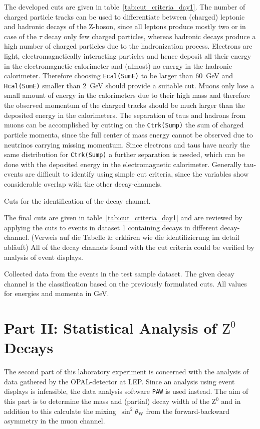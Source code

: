\documentclass[11pt, a4paper]{article}
\numberwithin{equation}{section}
\newcommand{\korr}[1]{{\color{red}(#1)}}
\begin{document}
The developed cuts are given in table~\ref{tab:cut_criteria_day1}.
The number of charged particle tracks can be used to differentiate between (charged) leptonic and hadronic decays of the Z-boson, since all leptons produce mostly two or in case of the $\tau$ decay only few charged particles, whereas hadronic decays produce a high number of charged particles due to the hadronization process.
Electrons are light, electromagnetically interacting particles and hence deposit all their energy in the electromagnetic calorimeter and (almost) no energy in the hadronic calorimeter.
Therefore choosing \texttt{Ecal(SumE)} to be larger than \SI{60}{GeV} and \texttt{Hcal(SumE)} smaller than \SI{2}{GeV} should provide a suitable cut.
Muons only lose a small amount of energy in the calorimeters due to their high mass and therefore the observed momentum of the charged tracks should be much larger than the deposited energy in the calorimeters.
The separation of taus and hadrons from muons can be accomplished by cutting on the \texttt{Ctrk(Sump)} the sum of charged particle momenta, since the full center of mass energy cannot be observed due to neutrinos carrying missing momentum.
Since electrons and taus have nearly the same distribution for \texttt{Ctrk(Sump)} a further separation is needed, which can be done with the deposited energy in the electromagnetic calorimeter.
Generally tau-events are difficult to identify using simple cut criteria, since the variables show considerable overlap with the other decay-channels.
\begin{table}[htb]
	\centering
	
	\caption{Cuts for the identification of the decay channel.}
	\label{tab:cut_criteria_day1}
\end{table}

The final cuts are given in table~\ref{tab:cut_criteria_day1} and are reviewed by applying the cuts to events in dataset 1 containing decays in different decay-channel.
\korr{Verweis auf die Tabelle \& erklären wie die identifizierung im detail abläuft}
All of the decay channels found with the cut criteria could be verified by analysis of event displays.
\begin{table}
	\centering
		
	\caption{Collected data from the events in the test sample dataset. The given decay channel is the classification based on the previously formulated cuts. All values for energies and momenta in \si{GeV}.}
\end{table}

\clearpage
\section{Part II: Statistical Analysis of $\mathrm{Z}^0$ Decays}
The second part of this laboratory experiment is concerned with the analysis of data gathered by the OPAL-detector at LEP.
Since an analysis using event displays is infeasible, the data analysis software \texttt{PAW} is used instead.
The aim of this part is to determine the mass and (partial) decay width of the $\mathrm{Z}^0$ and in addition to this calculate the mixing~$\sin^2\theta_\mathrm{W}$ from the forward-backward asymmetry in the muon channel.
\end{document}
